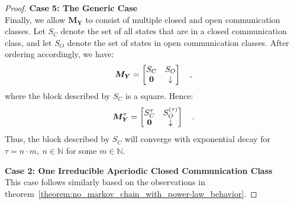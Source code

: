 \documentclass[../../main.tex]{subfiles}
\begin{document}
\begin{proof}
        \textbf{Case 5: The Generic Case} \\
        Finally, we allow $\bm{M_Y}$ to consist of multiple closed and open communication classes. Let $S_C$ denote the set of all states that are in a closed communication class, and let $S_O$ denote the set of states in open communication classes. After ordering accordingly, we have:
        \[
            \bm{M_Y} = 
            \begin{bmatrix}
            S_C & S_O \\
            \bf{0} & \downarrow \\
            \end{bmatrix}
            \quad ,
        \]
        where the block described by $S_C$ is a square. Hence:
        \[
            \bm{M_Y}^\tau = 
            \begin{bmatrix}
            S_C^\tau & S_O^{(\tau)} \\
            \bf{0} & \downarrow \\
            \end{bmatrix}
            \quad .
        \]
        Thus, the block described by $S_C$ will converge with exponential decay for $\tau = n \cdot m, \ n \in \mathbb{N}$ for some $m \in \mathbb{N}$.

        \textbf{Case 2: One Irreducible Aperiodic Closed Communication Class} \\
        This case follows similarly based on the observations in theorem~\ref{theorem:no_markov_chain_with_power-law_behavior}.


    \end{proof}
\end{document}
